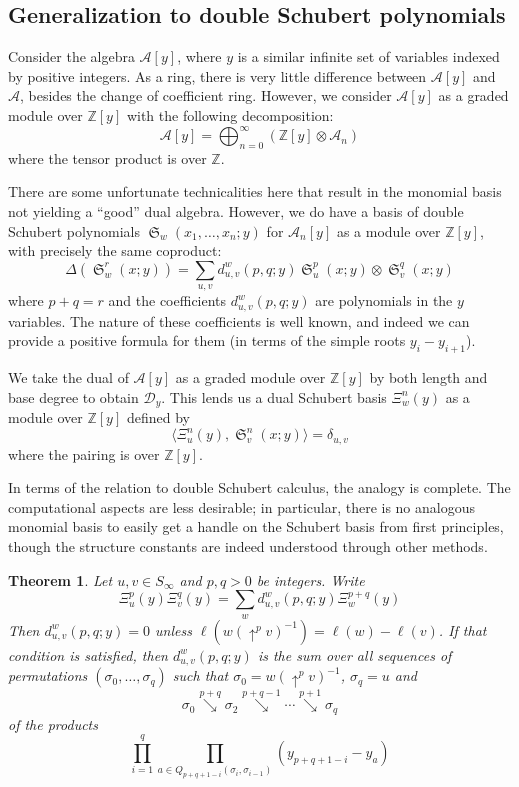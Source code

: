 \documentclass{amsart}
\newtheorem{theorem}{Theorem}[section]
\theoremstyle{definition}
\theoremstyle{remark}
\numberwithin{equation}{subsection}
\DeclareMathOperator{\sch}{\mathfrak{S}}
\newcommand{\shup}{{\uparrow}}
\newcommand{\downvar}[1]{\stackrel{#1}{\searrow}}
\newcommand{\dsch}{\ensuremath{\Xi}}
\newcommand{\coma}{\mathcal{A}}
\newcommand{\dcoma}{\mathcal{D}}
\begin{document}
\subsection{Generalization to double Schubert polynomials}
 Consider the algebra $\coma[y]$, where $y$ is a similar infinite set of variables indexed by positive integers. As a ring, there is very little difference between $\coma[y]$ and $\coma$, besides the change of coefficient ring. However, we consider $\coma[y]$ as a graded module over $\mathbb{Z}[y]$ with the following decomposition:
 $$\coma[y] = \bigoplus_{n=0}^\infty \left(\mathbb{Z}[y]\otimes\coma_n\right)$$
 where the tensor product is over $\mathbb{Z}$.

 There are some unfortunate technicalities here that result in the monomial basis not yielding a ``good'' dual algebra. However, we do have a basis of double Schubert polynomials $\sch_w(x_1,\ldots,x_n;y)$ for $\coma_n[y]$ as a module over $\mathbb{Z}[y]$, with precisely the same coproduct:
 $$\Delta(\sch_w^r(x;y)) = \sum_{u,v}d_{u,v}^w(p,q;y)\sch_u^p(x;y)\otimes \sch_v^q(x;y)$$
 where $p+q=r$ and the coefficients $d_{u,v}^w(p,q;y)$ are polynomials in the $y$ variables. The nature of these coefficients is well known, and indeed we can provide a positive formula for them (in terms of the simple roots $y_i-y_{i+1}$).

 We take the dual of $\coma[y]$ as a graded module over $\mathbb{Z}[y]$ by both length and base degree to obtain $\dcoma_y$. This lends us a dual Schubert basis $\dsch_w^n(y)$ as a module over $\mathbb{Z}[y]$ defined by
  $$\langle \dsch_u^n(y), \sch_v^n(x;y)\rangle = \delta_{u,v}$$
  where the pairing is over $\mathbb{Z}[y]$. 
  
  In terms of the relation to double Schubert calculus, the analogy is complete. The computational aspects are less desirable; in particular, there is no analogous monomial basis to easily get a handle on the Schubert basis from first principles, though the structure constants are indeed understood through other methods.

  \begin{theorem} \label{theorem:LRdualdouble}
Let $u,v\in S_\infty$ and $p,q>0$ be integers. Write
$$\dsch_u^p(y)\dsch_v^q(y) = \sum_w d_{u,v}^w(p,q;y)\dsch_w^{p+q}(y)$$
Then $d_{u,v}^w(p,q;y)=0$ unless $\ell(w(\shup^{p}v)^{-1}) = \ell(w)-\ell(v)$. If that condition is satisfied, then $d_{u,v}^w(p,q;y)$ is the sum over all sequences of permutations $(\sigma_0,\ldots,\sigma_q)$ such that $\sigma_0 = w(\shup^{p}v)^{-1}$, $\sigma_q = u$ and
$$\sigma_0\downvar{p+q}\sigma_2\downvar{p+q-1}\cdots \downvar{p+1}\sigma_{q}$$
of the products
$$\prod_{i=1}^{q}\prod_{a\in Q_{p+q+1-i}(\sigma_{i},\sigma_{i-1})}(y_{p+q+1 - i} - y_a)$$
\end{theorem}
\end{document}
